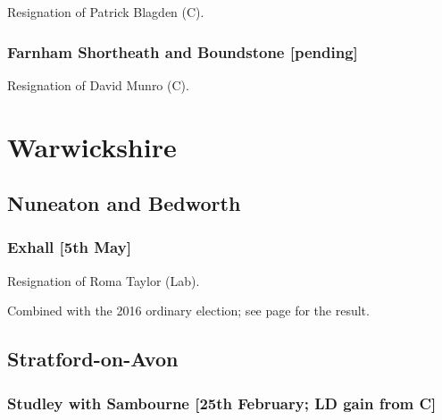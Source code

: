 \documentclass[a4paper,openany]{book}
\begin{document}
\begin{resultsiii}

Resignation of Patrick Blagden (C).

\subsubsection*{Farnham Shortheath and Boundstone \hspace*{\fill}\nolinebreak[1]%
\enspace\hspace*{\fill}
[pending]}


Resignation of David Munro (C).

\section{Warwickshire}

\subsection*{Nuneaton and Bedworth}

\subsubsection*{Exhall \hspace*{\fill}\nolinebreak[1]%
\enspace\hspace*{\fill}
[5th May]}


Resignation of Roma Taylor (Lab).

Combined with the 2016 ordinary election; see page \pageref{ExhallNuneatonBedworth} for the result.

\subsection*{Stratford-on-Avon}

\subsubsection*{Studley with Sambourne \hspace*{\fill}\nolinebreak[1]%
\enspace\hspace*{\fill}
[25th February; LD gain from C]}


\end{resultsiii}
\end{document}
